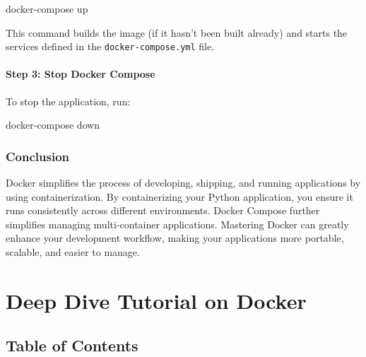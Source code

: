 \documentclass[
  letterpaper,
  DIV=11,
  numbers=noendperiod]{scrreprt}
\newenvironment{Shaded}{\begin{snugshade}}{\end{snugshade}}
\newcommand{\ExtensionTok}[1]{\textcolor[rgb]{0.00,0.23,0.31}{#1}}
\newcommand{\NormalTok}[1]{\textcolor[rgb]{0.00,0.23,0.31}{#1}}
\begin{document}
\begin{Shaded}
\begin{Highlighting}[]
\ExtensionTok{docker{-}compose}\NormalTok{ up}
\end{Highlighting}
\end{Shaded}

This command builds the image (if it hasn't been built already) and
starts the services defined in the \texttt{docker-compose.yml} file.

\subsubsection{Step 3: Stop Docker
Compose}\label{step-3-stop-docker-compose-1}

To stop the application, run:

\begin{Shaded}
\begin{Highlighting}[]
\ExtensionTok{docker{-}compose}\NormalTok{ down}
\end{Highlighting}
\end{Shaded}

\subsection{Conclusion}\label{conclusion-60}

Docker simplifies the process of developing, shipping, and running
applications by using containerization. By containerizing your Python
application, you ensure it runs consistently across different
environments. Docker Compose further simplifies managing multi-container
applications. Mastering Docker can greatly enhance your development
workflow, making your applications more portable, scalable, and easier
to manage.


\chapter{Deep Dive Tutorial on
Docker}\label{deep-dive-tutorial-on-docker}

\section{Table of Contents}\label{table-of-contents-27}
\end{document}
